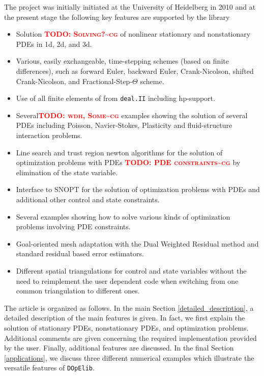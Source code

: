 \documentclass[prodmode,acmtoms]{acmsmall}
\numberwithin{equation}{section}
\newcommand{\deal}{\texttt{deal.II}}
\newcommand{\dope}{\texttt{DOpElib}}
\newcommand{\todocg}[1]{\textbf{\textsc{\textcolor{red}{TODO: #1\textasciitilde cg}}}}
\begin{document}
The project was initially initiated at the University of Heidelberg in 2010 and  
at the present stage the following key features are supported by the library
\begin{itemize}
\item Solution \todocg{Solving?} of nonlinear stationary and nonstationary PDEs in 1d, 2d, and 3d.
\item Various, easily exchangeable, 
  time-stepping schemes (based on finite differences), 
  such as forward Euler, backward Euler,
  Crank-Nicolson, shifted Crank-Nicolson, and Fractional-Step-$\Theta$ scheme.
\item Use of all finite elements of from \deal{} including hp-support.
\item Several\todocg{wdh, Some} examples showing the solution of several PDEs including
   Poisson, Navier-Stokes, Plasticity and fluid-structure interaction problems. 
\item Line search and trust region newton algorithms for the 
   solution of optimization problems with PDEs \todocg{PDE constraints} by elimination of 
   the state variable.
\item Interface to SNOPT for the solution of optimization problems with PDEs and
  additional other control and state constraints.
\item Several examples showing how to solve various kinds of optimization 
  problems involving PDE constraints.
\item Goal-oriented mesh adaptation with the Dual Weighted Residual method and
  standard residual based error estimators.
\item Different spatial triangulations for control and state variables without
  the need to reimplement the user dependent code when switching from one common 
  triangulation to different ones.
\end{itemize}

The article is organized as follows. In the main Section
\ref{detailed_description}, a detailed description of 
the main features is given. In fact, we first explain the solution 
of stationary PDEs, nonstationary PDEs, and optimization problems. 
Additional comments are given concerning the required implementation 
provided by the user.
Finally, additional features are discussed. In the final Section
\ref{applications}, we discuss three different numerical 
examples which illustrate the versatile features of \dope{}. 



\end{document}
